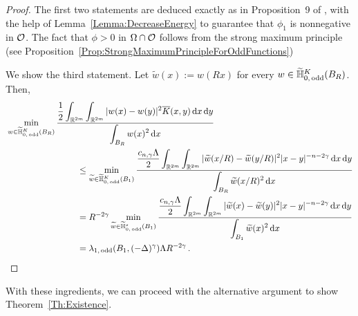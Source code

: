 \begin{proof}
	The first two statements are deduced exactly as in Proposition~9 of \cite{ServadeiValdinoci}, with the help of Lemma~\ref{Lemma:DecreaseEnergy} to guarantee that $\phi_1$ is nonnegative in $\mathcal{O}$. The fact that $\phi > 0$ in $\Omega \cap \mathcal{O}$ follows from the strong maximum principle (see Proposition~\ref{Prop:StrongMaximumPrincipleForOddFunctions})
	
	We show the third statement. Let $\widetilde{w} (x):= w(Rx)$ for every $w\in \widetilde{\mathbb{H}}^K_{0, \, \mathrm{odd}}(B_R)$. Then,
	\begin{align*}
	& \min_{w \in \widetilde{\mathbb{H}}^K_{0, \, \mathrm{odd}}(B_R)} \dfrac{\dfrac{1}{2}  \displaystyle\int_{\mathbb{R}^{2m}} \int_{\mathbb{R}^{2m}} |w(x) - w(y)|^2 \overline{K}(x,y) \,\mathrm{d} x \,\mathrm{d} y}{ \displaystyle \int_{B_R} w(x)^2 \,\mathrm{d} x} \quad \quad \quad \quad \quad \quad \quad \quad \quad \quad \quad \quad\\
	&  \quad \quad \quad \quad \quad \quad \quad \quad \leq \min_{\widetilde{w} \in \widetilde{\mathbb{H}}^K_{0, \, \mathrm{odd}}(B_1)} \dfrac{\dfrac{c_{n, \gamma}\Lambda}{2}  \displaystyle\int_{\mathbb{R}^{2m}} \int_{\mathbb{R}^{2m}} |\widetilde{w}(x/R) - \widetilde{w}(y/R)|^2 |x - y|^{-n-2 \gamma}\,\mathrm{d} x \,\mathrm{d} y}{ \displaystyle \int_{B_R} \widetilde{w}(x/R)^2 \,\mathrm{d} x}
	\\
	& \quad \quad \quad \quad \quad \quad \quad \quad = R^{-2 \gamma }\min_{\widetilde{w} \in \widetilde{\mathbb{H}}^s_{0, \, \mathrm{odd}}(B_1)} \dfrac{\dfrac{c_{n, \gamma}\Lambda}{2}  \displaystyle\int_{\mathbb{R}^{2m}} \int_{\mathbb{R}^{2m}} |\widetilde{w}(x) - \widetilde{w}(y)|^2 |x - y|^{-n-2 \gamma}\,\mathrm{d} x \,\mathrm{d} y}{ \displaystyle \int_{B_1} \widetilde{w}(x)^2 \,\mathrm{d} x}
	\\
	& \quad \quad \quad \quad \quad \quad \quad \quad = \lambda_{1, \, \mathrm{odd}}(B_1, (-\Delta)^\gamma) \Lambda R^{-2 \gamma } \,.
	\end{align*}
\end{proof}


With these ingredients, we can proceed with the alternative argument to show Theorem~\ref{Th:Existence}.

